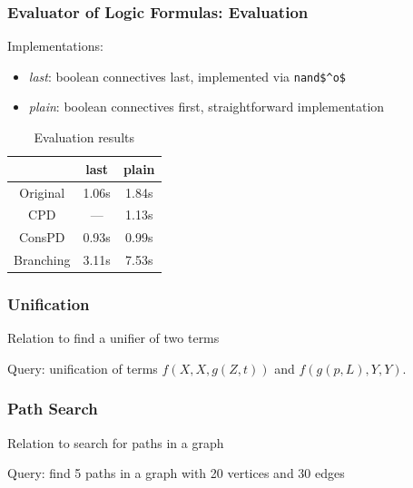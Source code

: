 \documentclass[xcolor=table]{beamer}
\begin{document}
\begin{frame}[fragile]
  \frametitle{Evaluator of Logic Formulas: Evaluation}
Implementations:

\begin{itemize}
  \item \emph{last}: boolean connectives last, implemented via \lstinline{nand$^o$}
  \item \emph{plain}: boolean connectives first, straightforward implementation
\end{itemize}


\begin{table}
  \centering
  \begin{tabular}{c||c|c}
                   & last  & plain  \\ \hline\hline
  Original         & 1.06s & 1.84s  \\ \hline
  CPD              & ---   & 1.13s  \\ \hline
  ConsPD           & 0.93s & 0.99s  \\ \hline
  Branching        & 3.11s & 7.53s  \\ \hline
  \end{tabular}

  \caption{Evaluation results}
\end{table}
\end{frame}

\begin{frame}[fragile]
  \frametitle{Unification}
Relation to find a unifier of two terms

\vspace{0.5cm}

Query: unification of terms $f (X, X, g(Z,t))$ and $f (g(p,L),Y,Y)$.
\end{frame}

\begin{frame}[fragile]
  \frametitle{Path Search}
Relation to search for paths in a graph

\vspace{0.5cm}

Query: find 5 paths in a graph with 20 vertices and 30 edges

\end{frame}
\end{document}
